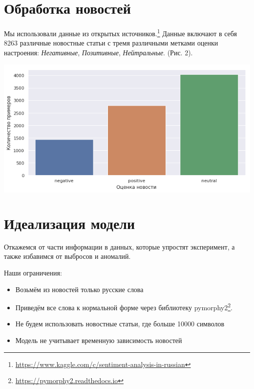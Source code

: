 \documentclass[12pt]{article}
\begin{document}
    \section{Обработка новостей}
        Мы использовали данные из открытых источников.\footnote{\href{https://www.kaggle.com/c/sentiment-analysis-in-russian}{https://www.kaggle.com/c/sentiment-analysis-in-russian}}
        Данные включают в себя 8263 различные новостные статьи с тремя различными метками оценки настроения: 
        \textit{Негативные}, \textit{Позитивные}, \textit{Нейтральные}. (Рис. 2).

        \begin{center}
            \includegraphics[scale=0.6]{sent_dist}
        \end{center}

        
    \section{Идеализация модели}
        Откажемся от части информации в данных, которые упростят эксперимент, а также избавимся 
        от выбросов и аномалий. 
        
        Наши ограничения:
        \begin{itemize}
            \item Возьмём из новостей только русские слова
            \item Приведём все слова к нормальной форме через библиотеку pymorphy2\footnote{\href{https://pymorphy2.readthedocs.io}{https://pymorphy2.readthedocs.io}}.
            \item Не будем использовать новостные статьи, где больше 10000 символов
            \item Модель не учитывает временную зависимость новостей
        \end{itemize}
\end{document}
